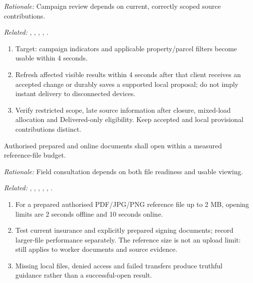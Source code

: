 \textit{Rationale:} Campaign review depends on current, correctly scoped source contributions.

\textit{Related:} \hyperref[fr:055]{}, \hyperref[fr:056]{}, \hyperref[fr:058]{}, \hyperref[fr:060]{}, \hyperref[fr:061]{}.
\begin{enumerate}[label=(\alph*),leftmargin=*,itemsep=1pt,topsep=3pt]
\item Target: campaign indicators and applicable property/parcel filters become usable within 4 seconds.
\item Refresh affected visible results within 4 seconds after that client receives an accepted change or durably saves a supported local proposal; do not imply instant delivery to disconnected devices.
\item Verify restricted scope, late source information after closure, mixed-load allocation and Delivered-only eligibility. Keep accepted and local provisional contributions distinct.
\end{enumerate}

\label{nfr:PERF-06}
Authorised prepared and online documents shall open within a measured reference-file budget.

\textit{Rationale:} Field consultation depends on both file readiness and usable viewing.

\textit{Related:} \hyperref[fr:038]{}, \hyperref[fr:039]{}, \hyperref[fr:040]{}, \hyperref[fr:045]{}, \hyperref[fr:049]{}, \hyperref[fr:051]{}.
\begin{enumerate}[label=(\alph*),leftmargin=*,itemsep=1pt,topsep=3pt]
\item For a prepared authorised PDF/JPG/PNG reference file up to 2 MB, opening limits are 2 seconds offline and 10 seconds online.
\item Test current insurance and explicitly prepared signing documents; record larger-file performance separately. The reference size is not an upload limit:  still applies to worker documents and source evidence.
\item Missing local files, denied access and failed transfers produce truthful guidance rather than a successful-open result.
\end{enumerate}

